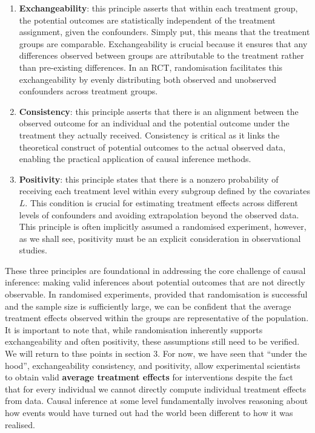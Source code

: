 \documentclass[
  singlecolumn]{article}
\begin{document}
\begin{enumerate}
\def\labelenumi{\arabic{enumi}.}
\item
  \textbf{Exchangeability}: this principle asserts that within each
  treatment group, the potential outcomes are statistically independent
  of the treatment assignment, given the confounders. Simply put, this
  means that the treatment groups are comparable. Exchangeability is
  crucial because it ensures that any differences observed between
  groups are attributable to the treatment rather than pre-existing
  differences. In an RCT, randomisation facilitates this exchangeability
  by evenly distributing both observed and unobserved confounders across
  treatment groups.
\item
  \textbf{Consistency}: this principle asserts that there is an
  alignment between the observed outcome for an individual and the
  potential outcome under the treatment they actually received.
  Consistency is critical as it links the theoretical construct of
  potential outcomes to the actual observed data, enabling the practical
  application of causal inference methods.
\item
  \textbf{Positivity}: this principle states that there is a nonzero
  probability of receiving each treatment level within every subgroup
  defined by the covariates \(L\). This condition is crucial for
  estimating treatment effects across different levels of confounders
  and avoiding extrapolation beyond the observed data. This principle is
  often implicitly assumed a randomised experiment, however, as we shall
  see, positivity must be an explicit consideration in observational
  studies.
\end{enumerate}

These three principles are foundational in addressing the core challenge
of causal inference: making valid inferences about potential outcomes
that are not directly observable. In randomised experiments, provided
that randomisation is successful and the sample size is sufficiently
large, we can be confident that the average treatment effects observed
within the groups are representative of the population. It is important
to note that, while randomisation inherently supports exchangeability
and often positivity, these assumptions still need to be verified. We
will return to thse points in section 3. For now, we have seen that
``under the hood'', exchangeability consistency, and positivity, allow
experimental scientists to obtain valid \textbf{average treatment
effects} for interventions despite the fact that for every individual we
cannot directly compute individual treatment effects from data. Causal
inference at some level fundamentally involves reasoning about how
events would have turned out had the world been different to how it was
realised.
\end{document}
